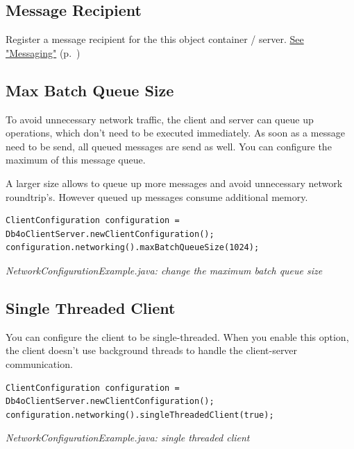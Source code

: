 \subsection{Message Recipient}
\label{ref:configuration-networking-message-recipient}

Register a message recipient for the this object container / server. \hyperref[ref:client-server-messaging]{See "Messaging"} (p.~\pageref{ref:client-server-messaging})

\subsection{Max Batch Queue Size}
\label{ref:configuration-networking-max-batch-queue-size}

To avoid unnecessary network traffic, the client and server can queue up operations, which don't need to be executed immediately. As soon as a message need to be send, all queued messages are send as well. You can configure the maximum of this message queue.

A larger size allows to queue up more messages and avoid unnecessary network roundtrip's. However queued up messages consume additional memory.

\begin{lstlisting}
ClientConfiguration configuration = Db4oClientServer.newClientConfiguration();
configuration.networking().maxBatchQueueSize(1024);
\end{lstlisting}

{\small\itshape NetworkConfigurationExample.java: change the maximum batch queue size\par}
\medskip

\subsection{Single Threaded Client}
\label{ref:configuration-networking-single-threaded-client}

You can configure the client to be single-threaded. When you enable this option, the client doesn't use background threads to handle the client-server communication.

\begin{lstlisting}
ClientConfiguration configuration = Db4oClientServer.newClientConfiguration();
configuration.networking().singleThreadedClient(true);
\end{lstlisting}

{\small\itshape NetworkConfigurationExample.java: single threaded client\par}
\medskip

